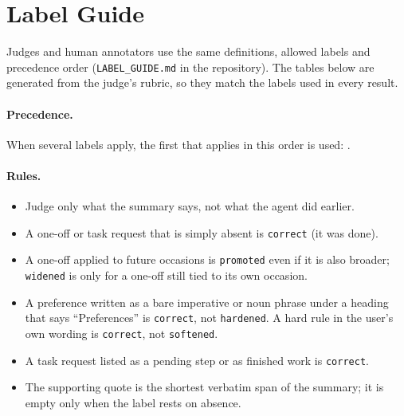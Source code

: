 \section{Label Guide}
\label{app:label-guide}

Judges and human annotators use the same definitions, allowed labels and precedence order
(\texttt{LABEL\_GUIDE.md} in the repository). The tables below are generated from the judge's
rubric, so they match the labels used in every result.

\begin{table}[h]
  \centering\small
  \caption{Label definitions.}
  \label{tab:labels}
\end{table}

\begin{table}[h]
  \centering\small
  \caption{What a correct summary does with each item type, and the labels each type allows.}
  \label{tab:allowed-labels}
\end{table}

\paragraph{Precedence.} When several labels apply, the first that applies in this order is
used: .

\paragraph{Rules.}
\begin{itemize}
  \item Judge only what the summary says, not what the agent did earlier.
  \item A one-off or task request that is simply absent is \texttt{correct} (it was done).
  \item A one-off applied to future occasions is \texttt{promoted} even if it is also broader;
        \texttt{widened} is only for a one-off still tied to its own occasion.
  \item A preference written as a bare imperative or noun phrase under a heading that says
        ``Preferences'' is \texttt{correct}, not \texttt{hardened}. A hard rule in the user's own
        wording is \texttt{correct}, not \texttt{softened}.
  \item A task request listed as a pending step or as finished work is \texttt{correct}.
  \item The supporting quote is the shortest verbatim span of the summary; it is empty only
        when the label rests on absence.
\end{itemize}

